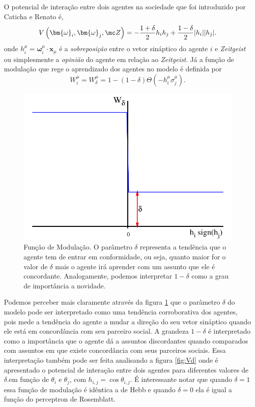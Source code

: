 O potencial de interação entre dois agentes na sociedade que foi introduzido
por Caticha e Renato\citep{Caticha2011a} é,
\begin{equation}
V \left(\bm{\omega}_i,\bm{\omega}_j,\mc Z\right)= 
    -\frac{1 + \delta }{2}h_ih_j +\frac{ 1 -\delta}{2}|h_i||h_j|.
\label{eq:Vdelta1}
\end{equation}
onde $h_i^\mu = \bm{\omega}_i^\mu \cdot \bm{x}_\mu $  é  a
\textit{sobreposição} entre o vetor sináptico do agente $i$ e
\textit{Zeitgeist} ou simplesmente a \textit{opinião} do agente em relação
ao \textit{Zeitgeist}.  Já a função de modulação que rege o aprendizado
dos agentes no modelo é definida por
\begin{equation}
W_{i}^\mu = W_{\delta}^\mu 
= 1 -\left( 1- \delta\right)\Theta\left(-h_i^\mu\sigma_j^\mu\right).
\label{eq:W1}
\end{equation}

\begin{figure}
    \centering
    \includegraphics[scale=0.5]{Figures/fdelta}
    \caption{
      Função de Modulação. O parâmetro $\delta$ representa a tendência
      que o agente tem de entrar em conformidade, ou seja, quanto maior for
      o valor de $\delta$ mais o agente irá aprender com um assunto que
      ele é concordante.  Analogamente, podemos interpretar $1 - \delta$ como a
      grau de importância a novidade.
  } 
  \label{fig:fdelta}
\end{figure}

Podemos perceber mais claramente através da figura \ref{fig:fdelta}
que o parâmetro $\delta$ do modelo pode ser interpretado como uma tendência
corroborativa dos agentes, pois mede a tendência do agente a mudar a direção
do seu vetor sináptico quando ele está em concordância com seu parceiro
social. A grandeza $1 -\delta$ é interpretado como a importância que o agente
dá a assuntos discordantes quando comparados com assuntos em que existe
concordância com seus parceiros sociais.  Essa interpretação também pode
ser feita analisando a figura \ref{fig:Vd} onde é apresentado o potencial de
interação entre dois agentes para diferentes valores de $\delta$.em função
de $\theta_i$ e $\theta_j$, com $h_{i,j} = \cos \theta_{i,j}$.  É interessante
notar que  quando $\delta = 1$ essa função de modulação é idêntica a de
Hebb e quando $\delta = 0$ ela é igual a função do perceptron de Rosemblatt.

